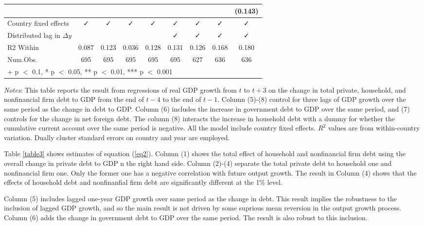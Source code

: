 \documentclass{ltjarticle}
\begin{document}
\begin{sidewaystable}
\begin{center}
\begin{tabular}[t]{lcccccccc}
             &  &  &  &  &  &  &  & (\num{0.143})\\
            \midrule
            Country fixed effects & ✓ & ✓ & ✓ & ✓ & ✓ & ✓ & ✓ & ✓\\
            Distributed lag in $\Delta y $ &  &  &  &  & ✓ & ✓ & ✓ & ✓\\
            R2 Within & \num{0.087} & \num{0.123} & \num{0.036} & \num{0.128} & \num{0.131} & \num{0.126} & \num{0.168} & \num{0.180}\\
            Num.Obs. & \num{695} & \num{695} & \num{695} & \num{695} & \num{695} & \num{627} & \num{636} & \num{636}\\
            \bottomrule
            \multicolumn{9}{l}{\rule{0pt}{1em}+ p $<$ 0.1, * p $<$ 0.05, ** p $<$ 0.01, *** p $<$ 0.001}\\
        \end{tabular}
    \end{center}
    \begin{tablenotes}
        \small
        \item \textit{Notes}: This table reports the result from regressions of real GDP growth from $t$ to $t+3$ on the change in total private, household, and nonfinancial firm debt to GDP from the end of $t-4$ to the end of $t-1$. Column (5)-(8) control for three lags of GDP growth over the same period as the change in debt to GDP. Column (6) includes the increase in government debt to GDP over the same period, and (7) controls for the change in net foreign debt. The column (8) interacts the increase in household debt with a dummy for whether the cumulative current account over the same period is negative. All the model include country fixed effects. $R^{2}$ values are from within-country variation. Dually cluster standard errors on country and year are employed.
    \end{tablenotes}
\end{sidewaystable}

Table \ref{table3} shows estimates of equation (\ref{eq2}). Column (1) shows the total effect of household and nonfinancial firm debt using the overall change in private debt to GDP n the right hand side. Column (2)-(4) separate the total private debt to household one and nonfinancial firm one. Only the former one has a negative correlation with future output growth. The result in Column (4) shows that the effects of household debt and nonfinanfial firm debt are significantly different at the 1\% level.

Column (5) includes lagged one-year GDP growth over same period as the change in debt. This result implies the robustness to the inclusion of lagged GDP growth, and so the main result is not driven by some suprious mean reversion in the output growth process. Column (6) adds the change in government debt to GDP over the same period. The result is also robust to this inclusion.
\end{document}
